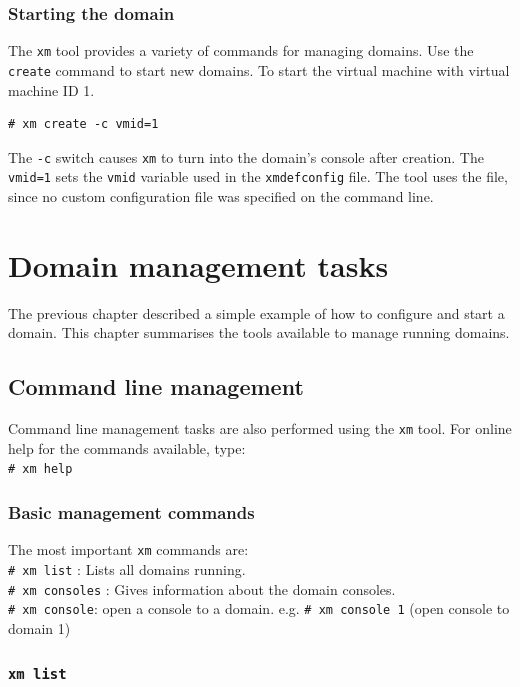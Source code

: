 \documentclass[11pt,twoside,final,openright]{xenstyle}
\begin{document}
\subsection{Starting the domain}

The {\tt xm} tool provides a variety of commands for managing domains.
Use the {\tt create} command to start new domains.  To start the
virtual machine with virtual machine ID 1.

\begin{verbatim}
# xm create -c vmid=1
\end{verbatim}

The {\tt -c} switch causes {\tt xm} to turn into the domain's console
after creation.  The {\tt vmid=1} sets the {\tt vmid} variable used in
the {\tt xmdefconfig} file.  The tool uses the
 file, since no custom configuration file
was specified on the command line.

\chapter{Domain management tasks}

The previous chapter described a simple example of how to configure
and start a domain.  This chapter summarises the tools available to
manage running domains.

\section{Command line management}

Command line management tasks are also performed using the {\tt xm}
tool.  For online help for the commands available, type:\\
\verb_# xm help_

\subsection{Basic management commands}

The most important {\tt xm} commands are: \\
\verb_# xm list_ : Lists all domains running. \\
\verb_# xm consoles_ : Gives information about the domain consoles. \\
\verb_# xm console_: open a console to a domain.
e.g. \verb_# xm console 1_ (open console to domain 1)

\subsection{\tt xm list}
\end{document}
